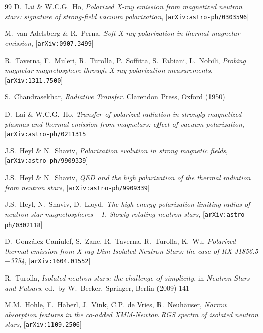 \documentclass{pos1}
\begin{document}
\begin{thebibliography}{99}
D.~Lai \& W.C.G.~Ho,
\textit{Polarized X-ray emission from magnetized neutron stars: signature of strong-field vacuum polarization},
[\texttt{arXiv:astro-ph/0303596}]

M.~van Adelsberg \& R.~Perna,
\textit{Soft X-ray polarization in thermal magnetar emission},
[\texttt{arXiv:0907.3499}]

R.~Taverna, F.~Muleri, R.~Turolla, P.~Soffitta, S.~Fabiani, L.~Nobili,
\textit{Probing magnetar magnetosphere through X-ray polarization measurements},
[\texttt{arXiv:1311.7500}]

S.~Chandrasekhar,
\textit{Radiative Transfer}.
Clarendon Press, Oxford (1950)

D.~Lai \& W.C.G.~Ho,
\textit{Transfer of polarized radiation in strongly magnetized plasmas and thermal emission from magnetars: effect of vacuum polarization},
[\texttt{arXiv:astro-ph/0211315}]

J.S.~Heyl \& N.~Shaviv,
\textit{Polarization evolution in strong magnetic fields},
[\texttt{arXiv:astro-ph/9909339}]

J.S.~Heyl \& N.~Shaviv,
\textit{QED and the high polarization of the thermal radiation from neutron stars},
[\texttt{arXiv:astro-ph/9909339}]

J.S.~Heyl, N.~Shaviv, D.~Lloyd,
\textit{The high-energy polarization-limiting radius of neutron star magnetospheres -- I. Slowly rotating neutron stars},
[\texttt{arXiv:astro-ph/0302118}]

D.~Gonz\'alez Caniulef, S.~Zane, R.~Taverna, R.~Turolla, K.~Wu,
\textit{Polarized thermal emission from X-ray Dim Isolated Neutron Stars:
the case of RX J1856.5$-$3754},
[\texttt{arXiv:1604.01552}]

R.~Turolla,
\textit{Isolated neutron stars: the challenge of simplicity},
in \textit{Neutron Stars and Pulsars},
ed.~by W.~Becker.
Springer, Berlin (2009) 141

M.M.~Hohle, F.~Haberl, J.~Vink, C.P.~de Vries, R.~Neuh\"auser,
\textit{Narrow absorption features in the co-added XMM-Newton RGS spectra of isolated neutron stars},
[\texttt{arXiv:1109.2506}]


\end{thebibliography}
\end{document}
